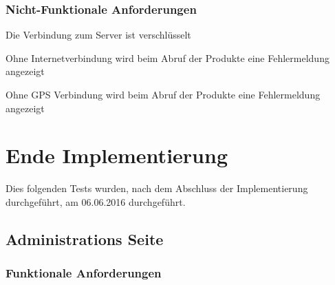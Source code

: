 \subsubsection{Nicht-Funktionale Anforderungen}
\begin{todolist}
	\item Die Verbindung zum Server ist verschlüsselt
	\item Ohne Internetverbindung wird beim Abruf der Produkte eine Fehlermeldung angezeigt
	\item Ohne GPS Verbindung wird beim Abruf der Produkte eine Fehlermeldung angezeigt
\end{todolist}



\section{Ende Implementierung}

Dies folgenden Tests wurden, nach dem Abschluss der Implementierung durchgeführt, am 06.06.2016 durchgeführt.

\subsection{Administrations Seite}
\subsubsection{Funktionale Anforderungen}

